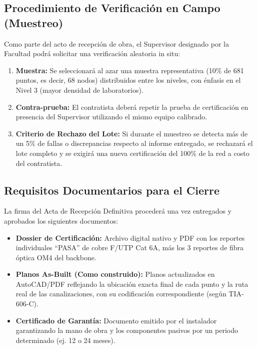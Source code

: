 \subsection*{Procedimiento de Verificación en Campo (Muestreo)}

Como parte del acto de recepción de obra, el Supervisor designado por la Facultad podrá solicitar una verificación aleatoria in situ:

\begin{enumerate}
    \item \textbf{Muestra:} Se seleccionará al azar una muestra representativa (10\% de 681 puntos, es decir, 68 nodos) distribuidos entre los \totalPisos{} niveles, con énfasis en el Nivel 3 (mayor densidad de laboratorios).
    \item \textbf{Contra-prueba:} El contratista deberá repetir la prueba de certificación en presencia del Supervisor utilizando el mismo equipo calibrado.
    \item \textbf{Criterio de Rechazo del Lote:} Si durante el muestreo se detecta más de un 5\% de fallas o discrepancias respecto al informe entregado, se rechazará el lote completo y se exigirá una nueva certificación del 100\% de la red a costo del contratista.
\end{enumerate}

\subsection*{Requisitos Documentarios para el Cierre}

La firma del Acta de Recepción Definitiva procederá una vez entregados y aprobados los siguientes documentos:

\begin{itemize}
    \item \textbf{Dossier de Certificación:} Archivo digital nativo y PDF con los \totalPuntos{} reportes individuales ``PASA'' de cobre F/UTP Cat 6A, más los 3 reportes de fibra óptica OM4 del backbone.
    \item \textbf{Planos As-Built (Como construido):} Planos actualizados en AutoCAD/PDF reflejando la ubicación exacta final de cada punto y la ruta real de las canalizaciones, con su codificación correspondiente (según TIA-606-C).
    \item \textbf{Certificado de Garantía:} Documento emitido por el instalador garantizando la mano de obra y los componentes pasivos por un periodo determinado (ej. 12 o 24 meses).
\end{itemize}
